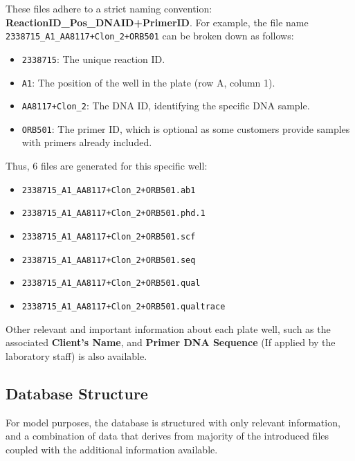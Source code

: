 These files adhere to a strict naming convention: \textbf{ReactionID\_Pos\_DNAID+PrimerID}. 
For example, the file name \texttt{2338715\_A1\_AA8117+Clon\_2+ORB501} can be broken down as follows:
\begin{itemize}
  \item \texttt{2338715}: The unique reaction ID.
  \item \texttt{A1}: The position of the well in the plate (row A, column 1).
  \item \texttt{AA8117+Clon\_2}: The DNA ID, identifying the specific DNA sample.
  \item \texttt{ORB501}: The primer ID, which is optional as some customers provide samples with primers already included.
\end{itemize}
Thus, 6 files are generated for this specific well: 
\begin{itemize}
  \item \texttt{2338715\_A1\_AA8117+Clon\_2+ORB501.ab1}
  \item \texttt{2338715\_A1\_AA8117+Clon\_2+ORB501.phd.1}
  \item \texttt{2338715\_A1\_AA8117+Clon\_2+ORB501.scf}
  \item \texttt{2338715\_A1\_AA8117+Clon\_2+ORB501.seq}
  \item \texttt{2338715\_A1\_AA8117+Clon\_2+ORB501.qual}
  \item \texttt{2338715\_A1\_AA8117+Clon\_2+ORB501.qualtrace}
\end{itemize}

Other relevant and important information about each plate well, such as the associated \textbf{Client's Name}, and \textbf{Primer DNA Sequence} (If applied by the laboratory staff) is also available.  

\subsection{Database Structure}
For model purposes, the database is structured with only relevant information, and a combination of data that derives from majority of the introduced files coupled with the additional information available.



